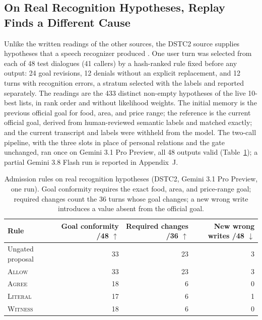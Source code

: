 \documentclass[acmsmall,review]{acmart}
\newcommand{\agree}{\textsc{Agree}}
\newcommand{\allow}{\textsc{Allow}}
\newcommand{\literal}{\textsc{Literal}}
\newcommand{\witness}{\textsc{Witness}}
\begin{document}
\subsection{On Real Recognition Hypotheses, Replay Finds a Different Cause}\label{sec:dstc2}
Unlike the written readings of the other sources, the DSTC2 source supplies hypotheses that a speech recognizer produced \cite{cite12}. One user turn was selected from each of 48 test dialogues (41 callers) by a hash-ranked rule fixed before any output: 24 goal revisions, 12 denials without an explicit replacement, and 12 turns with recognition errors, a stratum selected with the labels and reported separately. The readings are the 433 distinct non-empty hypotheses of the live 10-best lists, in rank order and without likelihood weights. The initial memory is the previous official goal for food, area, and price range; the reference is the current official goal, derived from human-reviewed semantic labels and matched exactly; and the current transcript and labels were withheld from the model. The two-call pipeline, with the three slots in place of personal relations and the gate unchanged, ran once on Gemini 3.1 Pro Preview, all 48 outputs valid (Table~\ref{tab:dstc2}); a partial Gemini 3.8 Flash run is reported in Appendix~J.

\begin{table}[tbp]
\centering
\caption{Admission rules on real recognition hypotheses (DSTC2, Gemini 3.1 Pro Preview, one run). Goal conformity requires the exact food, area, and price-range goal; required changes count the 36 turns whose goal changes; a new wrong write introduces a value absent from the official goal.}\label{tab:dstc2}
\small
\setlength{\tabcolsep}{3pt}
\begin{tabular}{@{}lrrr@{}}
\toprule
\textbf{Rule} & \textbf{Goal conformity /48 $\uparrow$} & \textbf{Required changes /36 $\uparrow$} & \textbf{New wrong writes /48 $\downarrow$} \\
\midrule
Ungated proposal & 33 & 23 & 3 \\
\allow{} & 33 & 23 & 3 \\
\agree{} & 18 & 6 & 0 \\
\literal{} & 17 & 6 & 1 \\
\witness{} & 18 & 6 & 0 \\
\bottomrule
\end{tabular}
\end{table}
\end{document}
